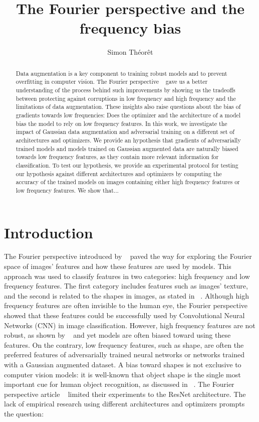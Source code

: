 \documentclass{article} \author{Simon Théorêt}
\title{The Fourier perspective and the frequency bias}
\begin{document}
\maketitle

\begin{abstract}
  Data augmentation is a key component to training robust models and
  to prevent overfitting in computer vision. The Fourier perspective
  ~\citep{yin2020fourier} gave us a better understanding of the
  process behind such improvements by showing us the tradeoffs between
  protecting against corruptions in low frequency and high frequency
  and the limitations of data augmentation. These insights also raise
  questions about the bias of gradients towards low frequencies: Does
  the optimizer and the architecture of a model bias the model to rely
  on low frequency features. In this work, we investigate the impact
  of Gaussian data augmentation and adversarial training on a
  different set of architectures and optimizers. We provide an
  hypothesis that gradients of adversarially trained models and models
  trained on Gaussian augmented data are naturally biased towards low
  frequency features, as they contain more relevant information for
  classification. To test our hypothesis, we provide an experimental
  protocol for testing our hypothesis against different architectures
  and optimizers by computing the accuracy of the trained models on
  images containing either high frequency features or low frequency
  features. We show that... %
\end{abstract}
\section{Introduction}
The Fourier perspective introduced by ~\citep{yin2020fourier} paved
the way for exploring the Fourier space of images’ features and how
these features are used by models. This approach was used to classify
features in two categories: high frequency and low frequency
features. The first category includes features such as images’
texture, and the second is related to the shapes in images, as stated
in ~\citep{krishnamachari2023fourier}. Although high frequency
features are often invisible to the human eye, the Fourier perspective
showed that these features could be successfully used by Convolutional
Neural Networks (CNN) in image classification. However, high frequency
features are not robust, as shown by ~\citep{zhang2019interpreting}
and yet models are often biased toward using these features. On the
contrary, low frequency features, such as shape, are often the
preferred features of adversarially trained neural networks or
networks trained with a Gaussian augmented dataset. A bias toward
shapes is not exclusive to computer vision models: it is well-known
that object shape is the single most important cue for human object
recognition, as discussed in ~\citep{landau}. The Fourier perspective
article ~\citep{yin2020fourier} limited their experiments to the
ResNet architecture. The lack of empirical research using different
architectures and optimizers prompts the question:
\end{document}
